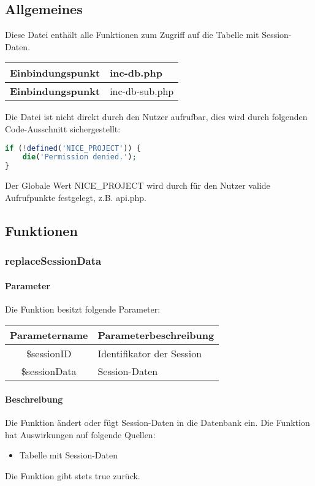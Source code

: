 \subsection{Allgemeines} Diese Datei enthält alle Funktionen zum Zugriff auf die Tabelle mit Session-Daten.
\begin{table}[H]
	\begin{tabular}{|c|p{11cm}|}
		\hline
		\textbf{Einbindungspunkt} & inc-db.php \\ \hline
		\textbf{Einbindungspunkt} & inc-db-sub.php \\ \hline
	\end{tabular}
\end{table}
Die Datei ist nicht direkt durch den Nutzer aufrufbar, dies wird durch folgenden Code-Ausschnitt sichergestellt:
\begin{lstlisting}[language=php]
if (!defined('NICE_PROJECT')) {
	die('Permission denied.');
}
\end{lstlisting}
Der Globale Wert {\glqq NICE\_PROJECT\grqq} wird durch für den Nutzer valide Aufrufpunkte festgelegt, z.B. {\glqq api.php\grqq}.
\newpage
\subsection{Funktionen}
\subsubsection{replaceSessionData}
\paragraph{Parameter} Die Funktion besitzt folgende Parameter:
\begin{table}[H]
	\begin{tabular}{|c|p{11cm}|}
		\hline
		\textbf{Parametername} & \textbf{Parameterbeschreibung} \\ \hline
		\$sessionID   & Identifikator der Session \\ \hline
		\$sessionData & Session-Daten \\ \hline
	\end{tabular}
\end{table}
\paragraph{Beschreibung} Die Funktion ändert oder fügt Session-Daten in die Datenbank ein. Die Funktion hat Auswirkungen auf folgende Quellen:
\begin{itemize}
	\item Tabelle mit Session-Daten
\end{itemize}
Die Funktion gibt stets {\glqq true\grqq} zurück.
